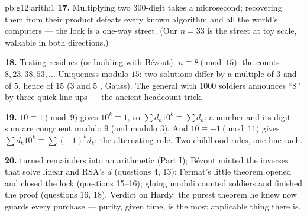 \begin{solution}{pb:g12:arith:1}
\textbf{17.} Multiplying two $300$-digit  takes a
microsecond; recovering them from their product defeats every
known algorithm and all the world's computers --- the lock is
a one-way street. (Our $n = 33$ is the street at toy scale,
walkable in both directions.)

\textbf{18.} Testing residues (or building with B\'ezout):
$n \equiv 8 \pmod{15}$: the counts $8, 23, 38, 53, \dots$
Uniqueness modulo $15$: two solutions differ by a multiple of
$3$ and of $5$, hence of $15$ ($3$ and $5$ , Gauss).
The general with $1000$ soldiers announces ``$8$'' by three
quick line-ups --- the ancient headcount trick.

\textbf{19.} $10 \equiv 1 \pmod 9$ gives $10^k \equiv 1$, so
$\sum d_k 10^k \equiv \sum d_k$: a number and its digit sum
are congruent modulo $9$ (and modulo $3$). And
$10 \equiv -1 \pmod{11}$ gives
$\sum d_k 10^k \equiv \sum (-1)^k d_k$: the alternating rule.
Two childhood rules, one line each.

\textbf{20.}  turned remainders into an arithmetic
(Part I); B\'ezout minted the inverses that solve linear
 and RSA's $d$ (questions 4, 13); Fermat's little
theorem opened and closed the lock (questions 15--16); gluing
 moduli counted soldiers and finished the proof
(questions 16, 18). Verdict on Hardy: the purest theorem he
knew now guards every purchase --- purity, given time, is the
most applicable thing there is.
\end{solution}
